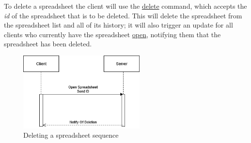 To delete a spreadsheet the client will use the \hyperref[sec:message:delete]{delete} 
command, which accepts the \emph{id} of the spreadsheet that is to be deleted. This will 
delete the spreadsheet from the spreadsheet list and all of its history; it will also trigger 
an update for all clients who currently have the spreadsheet \hyperref[sec:message:open]{open}, 
notifying them that the spreadsheet has been deleted.

\begin{figure}[H]
    \begin{center}
        \includegraphics[width=2.5in]{Figures/delete_sprd.png}
        \caption{Deleting a spreadsheet sequence}
    \end{center}
\end{figure}
